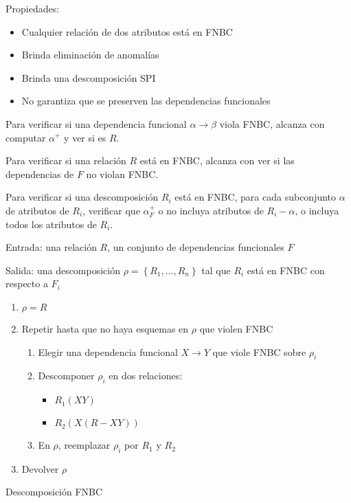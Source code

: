 \documentclass[a4paper, twoside]{article}
\begin{document}
Propiedades:
\begin{itemize}
	\item Cualquier relación de dos atributos está en FNBC
	\item Brinda eliminación de anomalías
	\item Brinda una descomposición SPI
	\item No garantiza que se preserven las dependencias funcionales
\end{itemize}

Para verificar si una dependencia funcional $\alpha\to\beta$ viola FNBC, alcanza con computar $\alpha^{+}$ y ver si es $R$.

Para verificar si una relación $R$ está en FNBC, alcanza con ver si las dependencias de $F$ no violan FNBC.

Para verificar si una descomposición $R_{i}$ está en FNBC, para cada subconjunto $\alpha$ de atributos de $R_{i}$, verificar que $\alpha_{F}^{+}$ o no incluya atributos de $R_{i}-\alpha$, o incluya todos los atributos de $R_{i}$.

\begin{algorithm}[H]
	Entrada: una relación $R$, un conjunto de dependencias funcionales $F$

	Salida: una descomposición $\rho=\left\{ R_{1},\ldots,R_{n}\right\}$ tal que $R_{i}$ está en FNBC con respecto a $F_{i}$
	\begin{enumerate}
		\item $\rho=R$
		\item Repetir hasta que no haya esquemas en $\rho$ que violen FNBC
		\begin{enumerate}
			\item Elegir una dependencia funcional $X\to Y$ que viole FNBC sobre $\rho_{i}$
			\item Descomponer $\rho_{i}$ en dos relaciones:
			\begin{itemize}
				\item $R_{1}(XY)$
				\item $R_{2}(X(R-XY))$
			\end{itemize}
			\item En $\rho$, reemplazar $\rho_{i}$ por $R_{1}$ y $R_{2}$
		\end{enumerate}
	\item Devolver $\rho$
	\end{enumerate}
	\caption{Descomposición FNBC}
\end{algorithm}
\end{document}
